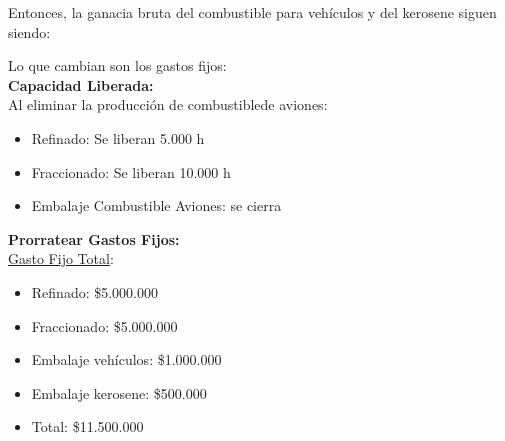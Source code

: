 \documentclass[10pt,a4paper]{article}
\begin{document}
\begin{enumerate}[label=\textbf{\sffamily\large\arabic*.}]
\begin{itemize}
    \end{itemize}

    Entonces, la ganacia bruta del combustible para vehículos y del kerosene siguen siendo: \\

    \begin{center}
    \end{center}

    \vspace{0.5em}

    Lo que cambian son los gastos fijos: \\

    \textbf{Capacidad Liberada:} \\

    Al eliminar la producción de combustiblede aviones:

    \begin{itemize}

        \item Refinado: Se liberan 5.000 h
        \item Fraccionado: Se liberan 10.000 h
        \item Embalaje Combustible Aviones: se cierra

    \end{itemize}

    \vspace{0.5em}

    \textbf{Prorratear Gastos Fijos:} \\

    \underline{Gasto Fijo Total}:

    \begin{itemize}

        \item Refinado: \$5.000.000
        \item Fraccionado: \$5.000.000
        \item Embalaje vehículos: \$1.000.000
        \item Embalaje kerosene: \$500.000 \\
        \item Total: \$11.500.000 \\


\end{itemize}
\end{enumerate}
\end{document}
